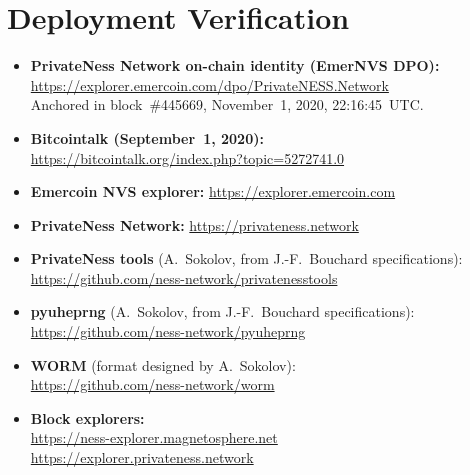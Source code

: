 \documentclass[11pt,a4paper]{article}
\theoremstyle{definition}
\begin{document}
\section{Deployment Verification}
\label{app:deployment}

\begin{itemize}
  \item \textbf{PrivateNess Network on-chain identity (EmerNVS DPO):}\\
        \url{https://explorer.emercoin.com/dpo/PrivateNESS.Network}\\
        Anchored in block~\#445669, November~1, 2020, 22:16:45~UTC.
  \item \textbf{Bitcointalk (September~1, 2020):}\\
        \url{https://bitcointalk.org/index.php?topic=5272741.0}
  \item \textbf{Emercoin NVS explorer:}
        \url{https://explorer.emercoin.com}
  \item \textbf{PrivateNess Network:}
        \url{https://privateness.network}
  \item \textbf{PrivateNess tools}
        (A.~Sokolov, from J.-F.~Bouchard specifications):\\
        \url{https://github.com/ness-network/privatenesstools}
  \item \textbf{pyuheprng}
        (A.~Sokolov, from J.-F.~Bouchard specifications):\\
        \url{https://github.com/ness-network/pyuheprng}
  \item \textbf{WORM} (format designed by A.~Sokolov):\\
        \url{https://github.com/ness-network/worm}
  \item \textbf{Block explorers:}\\
        \url{https://ness-explorer.magnetosphere.net}\\
        \url{https://explorer.privateness.network}
\end{itemize}
\end{document}
